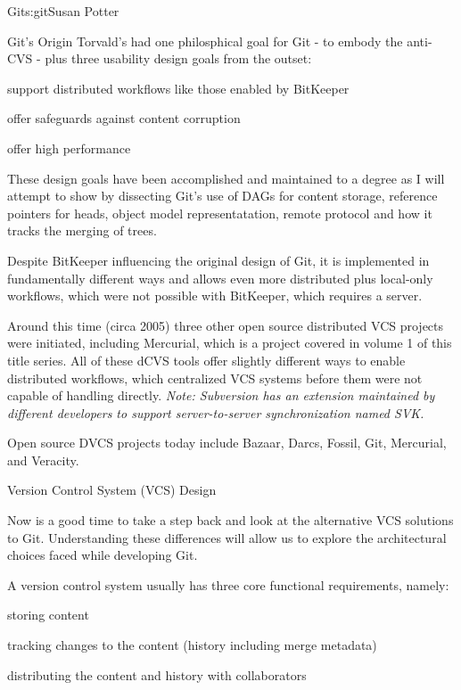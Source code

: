 \begin{aosachapter}{Git}{s:git}{Susan Potter}
\begin{aosasect1}{Git's Origin}
Torvald's had one philosphical goal for Git - to embody the anti-CVS - plus
three usability design goals from the outset:
\begin{aosaitemize}
  \item support distributed workflows like those enabled by BitKeeper
  \item offer safeguards against content corruption
  \item offer high performance
\end{aosaitemize}

These design goals have been accomplished and maintained to a degree as I
will attempt to show by dissecting Git's use of DAGs for content storage,
reference pointers for heads, object model representatation, remote protocol
and how it tracks the merging of trees.

Despite BitKeeper influencing the original design of Git, it is implemented
in fundamentally different ways and allows even more distributed plus
local-only workflows, which were not possible with BitKeeper, which requires
a server.

Around this time (circa 2005) three other open source distributed VCS projects
were initiated, including Mercurial, which is a project covered in volume 1
of this title series. All of these dCVS tools offer slightly different ways
to enable distributed workflows, which centralized VCS systems before them
were not capable of handling directly. \emph{Note: Subversion has an
extension maintained by different developers to support server-to-server
synchronization named SVK.}

Open source DVCS projects today include Bazaar, Darcs, Fossil, Git,
Mercurial, and Veracity.

\end{aosasect1}

\begin{aosasect1}{Version Control System (VCS) Design}

Now is a good time to take a step back and look at the alternative VCS
solutions to Git. Understanding these differences will allow us to explore
the architectural choices faced while developing Git.

A version control system usually has three core functional
requirements, namely:
\begin{aosaitemize}
  \item storing content
  \item tracking changes to the content (history including merge metadata)
  \item distributing the content and history with collaborators
\end{aosaitemize}


\end{aosasect1}
\end{aosachapter}
